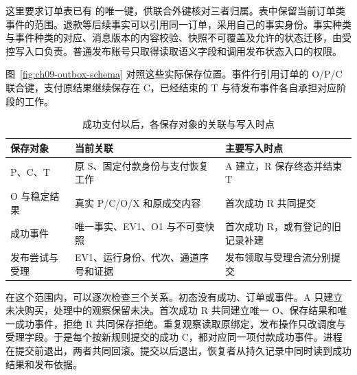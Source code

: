 这里要求订单表已有  的唯一键，供联合外键核对三者归属。表中保留当前订单类事件的范围。退款等后续事实可以引用同一订单，采用自己的事实身份。事实种类与事件种类的对应、消息版本的内容校验、快照不可覆盖及允许的状态迁移，由受控写入口负责。普通发布账号只取得读取语义字段和调用发布状态入口的权限。

图~\ref{fig:ch09-outbox-schema} 对照这些实际保存位置。事件行引用订单的 O/P/C 联合键，支付原结果继续保存在 C，已经结束的 T 与待发布事件各自承担对应阶段的工作。


\begin{table}[htbp]
\centering\small
\caption{成功支付以后，各保存对象的关联与写入时点}
\begin{tabularx}{\linewidth}{@{}p{.18\linewidth}XX@{}}
\toprule
保存对象 & 当前关联 & 主要写入时点\\
\midrule
P、C、T & 原 S、固定付款身份与支付恢复工作 & A 建立，R 保存终态并结束 T\\
O 与稳定结果 & 真实 P/C/O/X 和原成交内容 & 首次成功 R 共同提交\\
成功事件 & 唯一事实、EV1、O1 与不可变快照 & 首次成功 R，或有登记的旧记录补建\\
发布尝试与受理 & EV1、运行身份、代次、通道序号和证据 & 发布领取与受理合流分别提交\\
\bottomrule
\end{tabularx}
\end{table}


在这个范围内，可以逐次检查三个关系。初态没有成功、订单或事件。A 只建立未决购买，处理中的观察保留未决。首次成功 R 共同建立唯一 O、保存结果和唯一成功事件，拒绝 R 共同保存拒绝。重复观察读取原绑定，发布操作只改调度与受理字段。于是每个按新规则提交的成功 C，都对应同一项付款成功事件。进程在提交前退出，两者共同回滚。提交以后退出，恢复者从持久记录中同时读到成功结果和发布依据。
